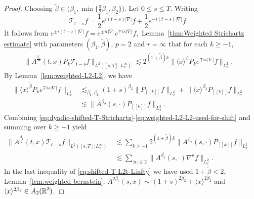 \documentclass[11pt,twoside]{article}
\def\R{\mathop{\mathbb R\kern 0pt}\nolimits}
\newcommand{\w}[1]{\langle {#1} \rangle}
\theoremstyle{plain}
\theoremstyle{definition}
\theoremstyle{assumption}
\numberwithin{equation}{section}
\begin{document}
	
	\begin{proof}
		Choosing $\widetilde\beta
		\in\big(\beta_1,
		\min\big\{\frac32\beta_1,\beta_2\big\}
		\big)$.
		Let \(0\le s\le T\). Writing
		\[
		\mathcal T_{t-s}f
		=
		\frac12 e^{i(t-s)|\nabla|}f
		+
		\frac12 e^{-i(t-s)|\nabla|}f.
		\]
		It follows from
		$e^{\pm i(t-s)|\nabla|}f
		=e^{\pm it|\nabla|}
		e^{\mp is|\nabla|}f,
		$
		Lemma~\ref{thm:Weighted Strichartz estimate} with parameters
		\((\beta_1,\widetilde\beta)\), \(p=2\) and \(r=\infty\) that  for
		each \(k\ge-1\),
		\begin{equation}
			\label{eq:dyadic-shifted-T-Strichartz}
			\begin{aligned}
				\big\|
				A^{\frac{\beta_1}{2}}(t,x)
				P_k\mathcal T_{t-s}f
				\big\|_{L^2([s,T];L^\infty_x)}
				\lesssim
				2^{(1+\widetilde\beta)k}
				\big\|
				\langle x\rangle^{\widetilde\beta}
				P_{k}e^{\mp is|\nabla|}f
				\big\|_{L^2_x}.
			\end{aligned}
		\end{equation}
	By Lemma~\ref{lem:weighted-L2-L2}, we have
		\begin{equation}
			\label{eq:weighted-L2-L2-used-for-shift}
			\begin{aligned}
				\big\|
				\langle x\rangle^{\widetilde\beta}
				P_{k}e^{\mp is|\nabla|}f
				\big\|_{L^2_x}
				&\lesssim_{\beta_1,\beta_2}
				(1+s)^{\beta_2}
				\|P_{[[k]]}f\|_{L^2_x}
				+\big\|
				\langle x\rangle^{\beta_2}
				P_{[[k]]}f
				\big\|_{L^2_x}\\
				&\lesssim
				\big\|
				A^{\beta_2}(s,\cdot)P_{[[k]]}f
				\big\|_{L^2_x}.
			\end{aligned}
		\end{equation}
		Combining \eqref{eq:dyadic-shifted-T-Strichartz}-\eqref{eq:weighted-L2-L2-used-for-shift} and summing over \(k\ge-1\) yield
		\begin{equation}
			\label{eq:shifted-T-L2t-Linfty}
			\begin{aligned}
				\big\|
				A^{\frac{\beta_1}{2}}(t,x)
				\mathcal T_{t-s}f
				\big\|_{L^2([s,T];L^\infty_x)}
				&\lesssim
				\sum_{k\ge-1}
				2^{(1+\widetilde\beta)k}
				\big\|
				A^{\beta_2}(s,\cdot)P_{[[k]]}f
				\big\|_{L^2_x}
				\\
				&\lesssim
				\sum_{|a|\le2}
				\big\|
				A^{\beta_2}(s,\cdot)\nabla^a f
				\big\|_{L^2_x}.
			\end{aligned}
		\end{equation}
		In the last inequality of \eqref{eq:shifted-T-L2t-Linfty} we have used \(1+\widetilde\beta<2\), Lemma~\ref{lem:weighted bernstein},
		\(A^{2\beta_2}(s,x) \sim (1+s)^{2\beta_2}+\w{x}^{2\beta_2}\) and $\w{x}^{2\beta_2} \in A_2(\R^3)$.
		

\end{proof}
\end{document}
